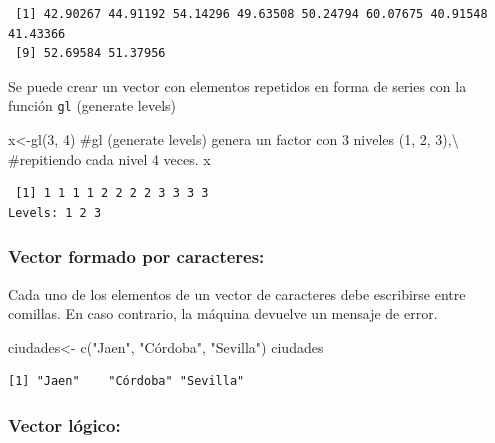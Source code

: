 \documentclass[
  letterpaper,
]{scrbook}
\newenvironment{Shaded}{\begin{snugshade}}{\end{snugshade}}
\newcommand{\CommentTok}[1]{\textcolor[rgb]{0.37,0.37,0.37}{#1}}
\newcommand{\DecValTok}[1]{\textcolor[rgb]{0.68,0.00,0.00}{#1}}
\newcommand{\FunctionTok}[1]{\textcolor[rgb]{0.28,0.35,0.67}{#1}}
\newcommand{\NormalTok}[1]{\textcolor[rgb]{0.00,0.23,0.31}{#1}}
\newcommand{\OtherTok}[1]{\textcolor[rgb]{0.00,0.23,0.31}{#1}}
\newcommand{\StringTok}[1]{\textcolor[rgb]{0.13,0.47,0.30}{#1}}
\begin{document}
\begin{verbatim}
 [1] 42.90267 44.91192 54.14296 49.63508 50.24794 60.07675 40.91548 41.43366
 [9] 52.69584 51.37956
\end{verbatim}

Se puede crear un vector con elementos repetidos en forma de series con
la función \texttt{gl} (generate levels)

\begin{Shaded}
\begin{Highlighting}[]
\NormalTok{x}\OtherTok{\textless{}{-}}\FunctionTok{gl}\NormalTok{(}\DecValTok{3}\NormalTok{, }\DecValTok{4}\NormalTok{) }\CommentTok{\#gl (generate levels) genera un factor con 3 niveles (1, 2, 3),\textbackslash{}}
\CommentTok{\#repitiendo cada nivel 4 veces. }
\NormalTok{x }
\end{Highlighting}
\end{Shaded}

\begin{verbatim}
 [1] 1 1 1 1 2 2 2 2 3 3 3 3
Levels: 1 2 3
\end{verbatim}

\hypertarget{vector-formado-por-caracteres}{%
\subsubsection{Vector formado por
caracteres:}\label{vector-formado-por-caracteres}}

Cada uno de los elementos de un vector de caracteres debe escribirse
entre comillas. En caso contrario, la máquina devuelve un mensaje de
error.

\begin{Shaded}
\begin{Highlighting}[]
\NormalTok{ciudades}\OtherTok{\textless{}{-}} \FunctionTok{c}\NormalTok{(}\StringTok{"Jaen"}\NormalTok{, }\StringTok{"Córdoba"}\NormalTok{, }\StringTok{"Sevilla"}\NormalTok{)}
\NormalTok{ciudades}
\end{Highlighting}
\end{Shaded}

\begin{verbatim}
[1] "Jaen"    "Córdoba" "Sevilla"
\end{verbatim}

\hypertarget{vector-luxf3gico}{%
\subsubsection{Vector lógico:}\label{vector-luxf3gico}}
\end{document}

